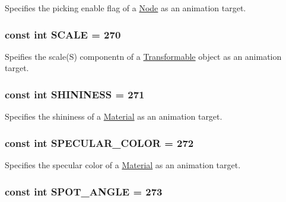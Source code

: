Specifies the picking enable flag of a \hyperlink{classm3g_1_1Node}{Node} as an animation target. \hypertarget{classm3g_1_1AnimationTrack_8334f0c0c56b96debb10231b86050ead}{
\subsubsection[{SCALE}]{\setlength{\rightskip}{0pt plus 5cm}const int {\bf SCALE} = 270}}
\label{classm3g_1_1AnimationTrack_8334f0c0c56b96debb10231b86050ead}


Speifies the scale(S) componentn of a \hyperlink{classm3g_1_1Transformable}{Transformable} object as an animation target. \hypertarget{classm3g_1_1AnimationTrack_f0b58ddb4173a8d2f5a730dab30e6c6f}{
\subsubsection[{SHININESS}]{\setlength{\rightskip}{0pt plus 5cm}const int {\bf SHININESS} = 271}}
\label{classm3g_1_1AnimationTrack_f0b58ddb4173a8d2f5a730dab30e6c6f}


Specifies the shininess of a \hyperlink{classm3g_1_1Material}{Material} as an animation target. \hypertarget{classm3g_1_1AnimationTrack_a0119030157ee8a5ef4f8ce88771447b}{
\subsubsection[{SPECULAR\_\-COLOR}]{\setlength{\rightskip}{0pt plus 5cm}const int {\bf SPECULAR\_\-COLOR} = 272}}
\label{classm3g_1_1AnimationTrack_a0119030157ee8a5ef4f8ce88771447b}


Specifies the specular color of a \hyperlink{classm3g_1_1Material}{Material} as an animation target. \hypertarget{classm3g_1_1AnimationTrack_c1d6b5313ef35ef100889ca885901db2}{
\subsubsection[{SPOT\_\-ANGLE}]{\setlength{\rightskip}{0pt plus 5cm}const int {\bf SPOT\_\-ANGLE} = 273}}
\label{classm3g_1_1AnimationTrack_c1d6b5313ef35ef100889ca885901db2}


